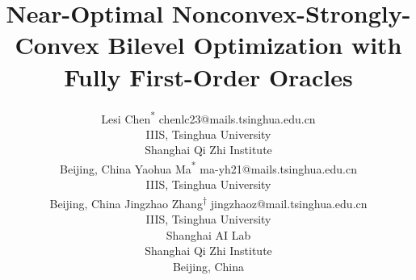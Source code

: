 \documentclass[twoside,11pt]{article}
\begin{document}
\title{ {Near-Optimal} Nonconvex-Strongly-Convex
Bilevel Optimization with Fully First-Order Oracles }

\author{\name Lesi Chen\textsuperscript{*} \email chenlc23@mails.tsinghua.edu.cn \\
       \addr  IIIS, Tsinghua University\\
       Shanghai Qi Zhi Institute \\
       Beijing, China
       \AND
       \name Yaohua Ma\textsuperscript{*} \email ma-yh21@mails.tsinghua.edu.cn \\
       \addr IIIS, Tsinghua University \\
       Beijing, China
       \AND
       \name Jingzhao Zhang\textsuperscript{$\dagger$} \email jingzhaoz@mail.tsinghua.edu.cn \\
       \addr 
       IIIS, Tsinghua University\\
       Shanghai AI Lab \\
       Shanghai Qi Zhi Institute\\
       Beijing, China
       }

\maketitle
\begingroup
\begin{NoHyper}
\renewcommand\thefootnote{*}
\end{NoHyper}
\begin{NoHyper}
\renewcommand\thefootnote{$\dagger$}
\end{NoHyper}
\endgroup

\end{document}
